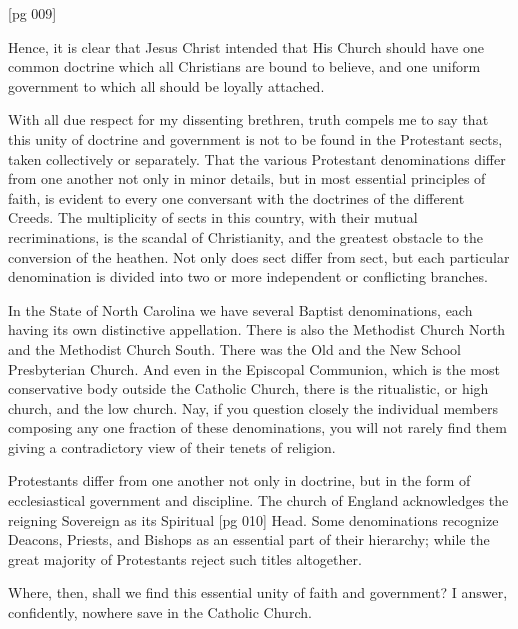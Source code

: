 [pg 009]

Hence, it is clear that Jesus Christ intended that
His Church should have one common doctrine
which all Christians are bound to believe, and one
uniform government to which all should be loyally
attached.

With all due respect for my dissenting brethren,
truth compels me to say that this unity of doctrine
and government is not to be found in the Protestant
sects, taken collectively or separately. That
the various Protestant denominations differ from
one another not only in minor details, but in most
essential principles of faith, is evident to every one
conversant with the doctrines of the different
Creeds. The multiplicity of sects in this country,
with their mutual recriminations, is the scandal of
Christianity, and the greatest obstacle to the conversion
of the heathen. Not only does sect differ
from sect, but each particular denomination is
divided into two or more independent or conflicting
branches.

In the State of North Carolina we have several
Baptist denominations, each having its own distinctive
appellation. There is also the Methodist
Church North and the Methodist Church South.
There was the Old and the New School Presbyterian
Church. And even in the Episcopal Communion,
which is the most conservative body outside
the Catholic Church, there is the ritualistic,
or high church, and the low church. Nay, if you
question closely the individual members composing
any one fraction of these denominations, you
will not rarely find them giving a contradictory
view of their tenets of religion.

Protestants differ from one another not only in
doctrine, but in the form of ecclesiastical government
and discipline. The church of England acknowledges
the reigning Sovereign as its Spiritual
[pg 010]
Head. Some denominations recognize Deacons,
Priests, and Bishops as an essential part of their
hierarchy; while the great majority of Protestants
reject such titles altogether.

Where, then, shall we find this essential unity of
faith and government? I answer, confidently, nowhere
save in the Catholic Church.

